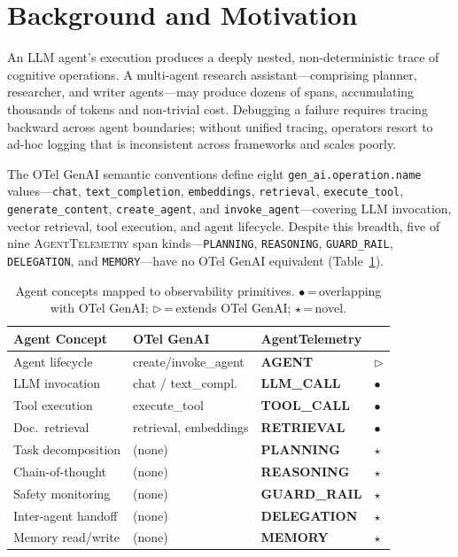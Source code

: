 \documentclass{article}
\begin{document}
\section{Background and Motivation}
\label{sec:background}

An LLM agent's execution produces a deeply nested, non-deterministic
trace of cognitive operations.  A multi-agent research
assistant---comprising planner, researcher, and writer agents---may
produce dozens of spans, accumulating thousands of tokens and
non-trivial cost.  Debugging a failure requires tracing backward
across agent boundaries; without unified tracing, operators resort to
ad-hoc logging that is inconsistent across frameworks and scales
poorly.

The OTel GenAI semantic conventions define eight
\texttt{gen\_ai.operation.name} values---\texttt{chat},
\texttt{text\_completion}, \texttt{embeddings}, \texttt{retrieval},
\texttt{execute\_tool}, \texttt{generate\_content},
\texttt{create\_agent}, and \texttt{invoke\_agent}---covering LLM
invocation, vector retrieval, tool execution, and agent lifecycle.
Despite this breadth, five of nine \textsc{AgentTelemetry} span
kinds---\texttt{PLANNING}, \texttt{REASONING}, \texttt{GUARD\_RAIL},
\texttt{DELEGATION}, and \texttt{MEMORY}---have no OTel GenAI
equivalent (Table~\ref{tab:gap}).

\begin{table}[t]
\centering
\small
\caption{Agent concepts mapped to observability primitives.
$\bullet$\,=\,overlapping with OTel GenAI;
$\triangleright$\,=\,extends OTel GenAI; $\star$\,=\,novel.}
\label{tab:gap}
\begin{tabular}{@{}llll@{}}
\toprule
\textbf{Agent Concept} & \textbf{OTel GenAI} & \textbf{AgentTelemetry} & \\
\midrule
Agent lifecycle    & create/invoke\_agent  & \textbf{AGENT} & $\triangleright$ \\
LLM invocation     & chat / text\_compl.   & \textbf{LLM\_CALL} & $\bullet$ \\
Tool execution     & execute\_tool         & \textbf{TOOL\_CALL} & $\bullet$ \\
Doc.\ retrieval    & retrieval, embeddings & \textbf{RETRIEVAL} & $\bullet$ \\
Task decomposition & (none)                & \textbf{PLANNING} & $\star$ \\
Chain-of-thought   & (none)                & \textbf{REASONING} & $\star$ \\
Safety monitoring  & (none)                & \textbf{GUARD\_RAIL} & $\star$ \\
Inter-agent handoff & (none)               & \textbf{DELEGATION} & $\star$ \\
Memory read/write  & (none)                & \textbf{MEMORY} & $\star$ \\
\bottomrule
\end{tabular}
\end{table}
\end{document}
